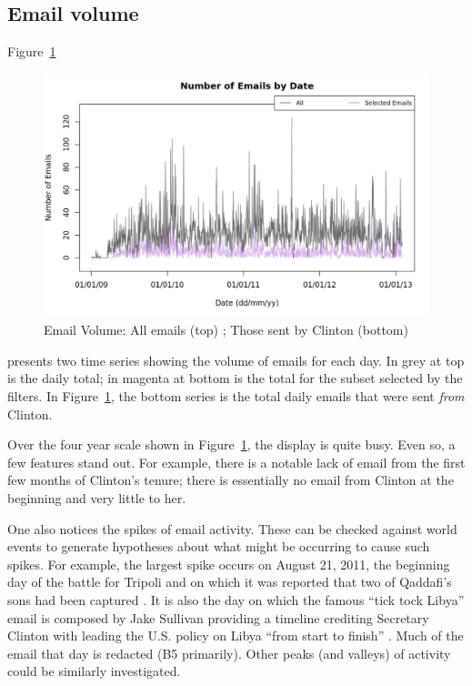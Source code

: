 \documentclass[journal]{vgtc}                %
\begin{document}
\subsection{Email volume}
\label{sect:Displays:volume}
Figure~\ref{fig:VolumeAll} 
\begin{figure}[h]
\begin{center}
\includegraphics[width=0.95\linewidth]{VolumeFullTime}
\caption{Email Volume: All emails (top) ; Those sent by Clinton (bottom)}
\label{fig:VolumeAll}
\end{center}
\end{figure}
presents two time series showing the volume of emails for each day.  In grey at top is the daily total; in magenta at bottom is the total for the subset selected by the filters.  In Figure~\ref{fig:VolumeAll}, the bottom series is the total daily emails that were sent \emph{from} Clinton.

Over the four year scale shown in Figure~\ref{fig:VolumeAll}, the display is quite busy.  Even so, a few features stand out.  For example, there is a notable lack of email from the first few months of Clinton's tenure;  there is essentially no email from Clinton at the beginning and very little to her.   

One also notices the spikes of email activity.  These can be checked against world events to generate hypotheses about what might be occurring to cause such spikes.  For example, the largest spike occurs on August 21, 2011, the beginning day of the battle for Tripoli and on which it was reported that two of Qaddafi's sons had been captured \cite{battleTripoli}.  It is also the day on which the famous ``tick tock Libya'' email is composed by Jake Sullivan providing a timeline crediting Secretary Clinton with leading the U.S.  policy on Libya ``from start to finish'' \cite{tickTockLibya}.  Much of the email that day is redacted (B5 primarily).   Other peaks (and valleys) of activity could be similarly investigated.
\end{document}
